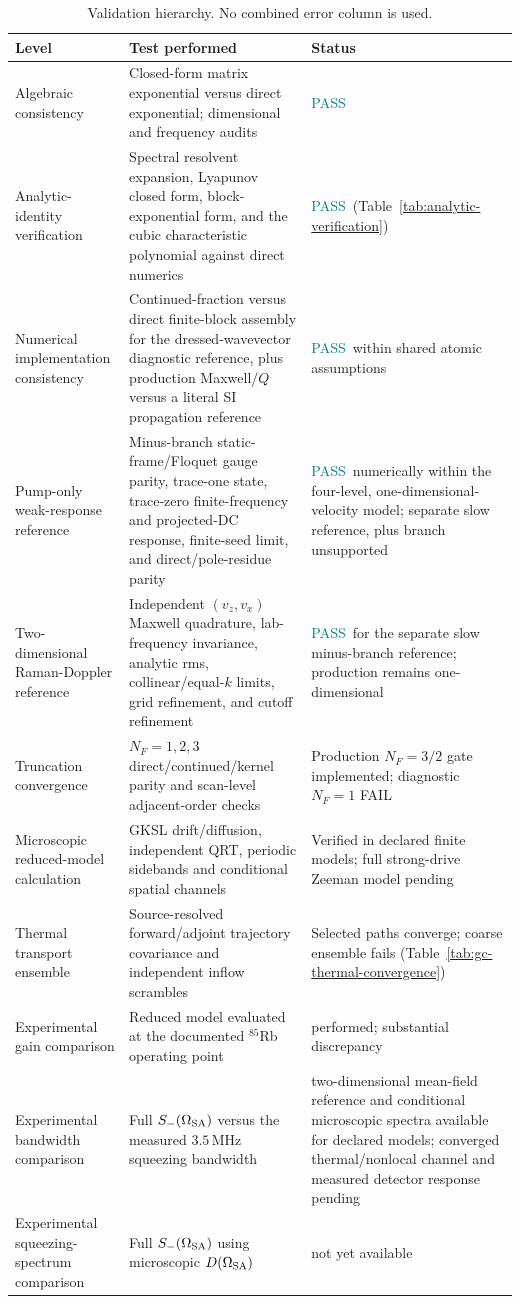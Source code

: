 \documentclass[11pt,a4paper]{article}
\newcommand{\MHz}{\,\mathrm{MHz}}
\newcommand{\pending}{\textcolor{amber}{not yet available}}
\newcommand{\pass}{\textcolor{teal}{PASS}}
\newcommand{\fail}{\textcolor{red!70!black}{FAIL}}
\begin{document}
\begin{table}[ht]
\centering
\caption{Validation hierarchy. No combined error column is used.}
\label{tab:validation-hierarchy}
\small
\begin{tabularx}{\textwidth}{L{3.4cm}Y L{3.0cm}}
\toprule
Level & Test performed & Status\\
\midrule
Algebraic consistency & Closed-form matrix exponential versus direct
exponential; dimensional and frequency audits & \pass\\
Analytic-identity verification & Spectral resolvent expansion, Lyapunov
closed form, block-exponential form, and the cubic characteristic polynomial
against direct numerics & \pass\ (Table~\ref{tab:analytic-verification})\\
Numerical implementation consistency & Continued-fraction versus direct
finite-block assembly for the dressed-wavevector diagnostic reference, plus production Maxwell/$Q$
versus a literal SI propagation reference & \pass\ within shared atomic
assumptions\\
Pump-only weak-response reference & Minus-branch static-frame/Floquet gauge
parity, trace-one state, trace-zero finite-frequency and projected-DC response,
finite-seed limit, and direct/pole-residue parity & \pass\ numerically within
the four-level, one-dimensional-velocity model; separate slow reference,
plus branch unsupported\\
Two-dimensional Raman-Doppler reference & Independent $(v_z,v_x)$ Maxwell
quadrature, lab-frequency invariance, analytic rms, collinear/equal-$k$ limits,
grid refinement, and cutoff refinement & \pass\ for the separate slow
minus-branch reference; production remains one-dimensional\\
Truncation convergence & $N_F=1,2,3$ direct/continued/kernel parity and
scan-level adjacent-order checks & Production $N_F=3/2$ gate implemented;
diagnostic $N_F=1$ \fail\\
Microscopic reduced-model calculation & GKSL drift/diffusion, independent QRT, periodic sidebands and conditional spatial channels & Verified in declared finite models; full strong-drive Zeeman model pending\\
Thermal transport ensemble & Source-resolved forward/adjoint trajectory covariance and independent inflow scrambles & Selected paths converge; coarse ensemble fails (Table~\ref{tab:gc-thermal-convergence})\\
Experimental gain comparison & Reduced model evaluated at the documented
$^{85}$Rb operating point & performed; substantial discrepancy\\
Experimental bandwidth comparison & Full $S_-(\Omega_{\rm SA})$ versus the
measured $3.5\MHz$ squeezing bandwidth & two-dimensional mean-field reference
and conditional microscopic spectra available for declared models; converged thermal/nonlocal channel and measured detector response pending\\
Experimental squeezing-spectrum comparison & Full
$S_-(\Omega_{\rm SA})$ using microscopic $D(\Omega_{\rm SA})$ &
\pending\\
\bottomrule
\end{tabularx}
\end{table}
\end{document}

